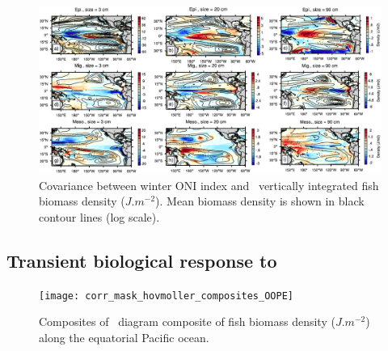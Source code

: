 \begin{figure}[h!]
    \centering
    \includegraphics[width=\textwidth] {figs/debugged_corr_mask_covariance_maps_OOPE.pdf}
    \caption{Covariance between winter ONI index and \ap\ vertically integrated fish biomass density ($J.m^{-2}$). Mean biomass density is shown in black contour lines (log scale).}
    \label{fig:cov-ape}
\end{figure}

\subsection{Transient biological response to \nino}

\begin{figure}[h!]
    \centering
    \texttt{[image: corr\_mask\_hovmoller\_composites\_OOPE]}
    \caption{Composites of \hov\ diagram composite of fish biomass density ($J.m^{-2}$) along the equatorial Pacific ocean.}
    \label{fig:hov-oope}
\end{figure}

\clearpage
